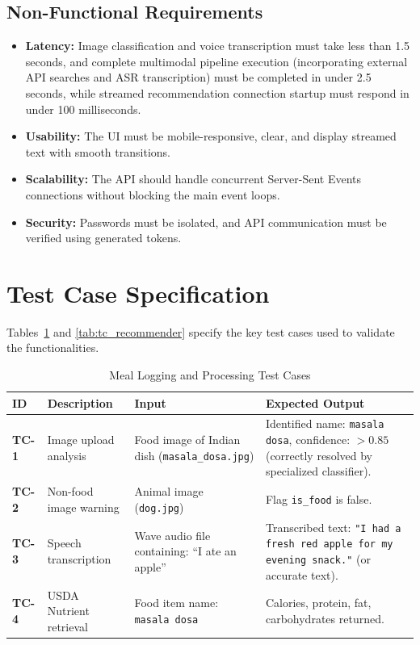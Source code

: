 \documentclass[12pt,a4paper,oneside]{report}
\begin{document}
\subsection{Non-Functional Requirements}
\begin{itemize}
    \item \textbf{Latency:} Image classification and voice transcription must take less than 1.5 seconds, and complete multimodal pipeline execution (incorporating external API searches and ASR transcription) must be completed in under 2.5 seconds, while streamed recommendation connection startup must respond in under 100 milliseconds.
    \item \textbf{Usability:} The UI must be mobile-responsive, clear, and display streamed text with smooth transitions.
    \item \textbf{Scalability:} The API should handle concurrent Server-Sent Events connections without blocking the main event loops.
    \item \textbf{Security:} Passwords must be isolated, and API communication must be verified using generated tokens.
\end{itemize}

\section{Test Case Specification}
Tables~\ref{tab:tc_detection} and \ref{tab:tc_recommender} specify the key test cases used to validate the functionalities.

\begin{table}[H]
    \centering
    \caption{Meal Logging and Processing Test Cases}
    \label{tab:tc_detection}
    \begin{tabular}{p{1cm}p{4cm}p{4cm}p{4.5cm}}
        \toprule
        \textbf{ID} & \textbf{Description} & \textbf{Input} & \textbf{Expected Output} \\
        \midrule
        \textbf{TC-1} & Image upload analysis & Food image of Indian dish (\texttt{masala\_dosa.jpg}) & Identified name: \texttt{masala dosa}, confidence: $>0.85$ (correctly resolved by specialized classifier). \\
        \textbf{TC-2} & Non-food image warning & Animal image (\texttt{dog.jpg}) & Flag \texttt{is\_food} is false. \\
        \textbf{TC-3} & Speech transcription & Wave audio file containing: ``I ate an apple'' & Transcribed text: \texttt{"I had a fresh red apple for my evening snack."} (or accurate text). \\
        \textbf{TC-4} & USDA Nutrient retrieval & Food item name: \texttt{masala dosa} & Calories, protein, fat, carbohydrates returned. \\
        \bottomrule
    \end{tabular}
\end{table}
\end{document}
